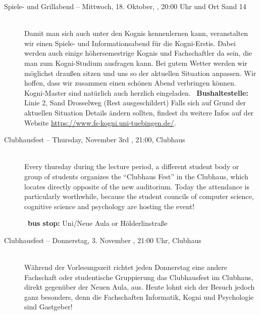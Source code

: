\begin{description}
\ifkogwiss
    \item[Spiele- und Grillabend -- Mittwoch, 18. Oktober, \YEAR, 20:00 Uhr und Ort Sand 14]\ \\
         Damit man sich auch unter den Kognis kennenlernen kann, veranstalten wir einen Spiele- und Informationsabend für die Kogni-Erstis. Dabei werden auch einige höhersemestrige Kognis und Fachschaftler da sein, die man zum Kogni-Studium ausfragen kann. Bei gutem Wetter werden wir möglichst draußen sitzen und uns so der aktuellen Situation anpassen. Wir hoffen, dass wir zusammen einen schönen Abend verbringen können. Kogni-Master sind natürlich auch herzlich eingeladen.
	~\textbf{Bushaltestelle:} Linie 2, Sand Drosselweg (Rest ausgeschildert)
	Falls sich auf Grund der aktuellen Situation Details ändern sollten, findest du weitere Infos auf der Website \url{https://www.fs-kogni.uni-tuebingen.de/}.
\fi


\ifml
    \item[Clubhausfest -- Thursday, November 3rd \YEAR, 21:00, Clubhaus]\ \\
        Every thursday during the lecture period, a different student body or group of students organizes the "`Clubhaus Fest"' in the Clubhaus, which locates directly opposite of the new auditorium. Today the attendance is particularly worthwhile, because the student councils of computer science, cognitive science and psychology are hosting the event! 

        ~\textbf{bus stop:} Uni/Neue Aula or Hölderlinstraße
\else
    \item[Clubhausfest -- Donnerstag, 3. November \YEAR, 21:00 Uhr, Clubhaus]\ \\
        Während der Vorlesungszeit richtet jeden Donnerstag eine andere Fachschaft oder studentische Gruppierung das Clubhausfest im Clubhaus, direkt gegenüber der Neuen Aula, aus. Heute lohnt sich der Besuch jedoch ganz besonders, denn die Fachschaften Informatik, Kogni und Psychologie sind Gastgeber!


\end{description}
